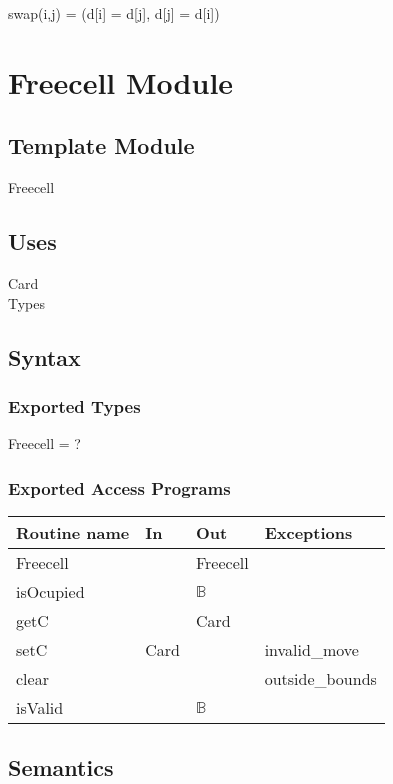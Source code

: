 \documentclass[12pt]{article}
\begin{document}
swap(i,j) = (d[i] = d[j], d[j] = d[i])


\newpage

\section* {Freecell Module}

\subsection*{Template Module}

Freecell

\subsection* {Uses}

Card\\
Types

\subsection* {Syntax}

\subsubsection* {Exported Types}

Freecell = ? 

\subsubsection* {Exported Access Programs}

\begin{tabular}{| l | l | l | l |}
	\hline
	\textbf{Routine name} & \textbf{In} & \textbf{Out} & \textbf{Exceptions}\\
	\hline
	Freecell & ~ & Freecell & \\
	\hline
	isOcupied & ~ & $\mathbb{B}$ & ~\\
	\hline
	getC & ~ & Card & ~\\
	\hline
	setC & Card & ~ & invalid\_move\\
	\hline
	clear & ~ & ~ & outside\_bounds\\
	\hline
	isValid & ~ & $\mathbb{B}$ & ~\\
	\hline
	
	
\end{tabular}

\subsection* {Semantics}
\end{document}
